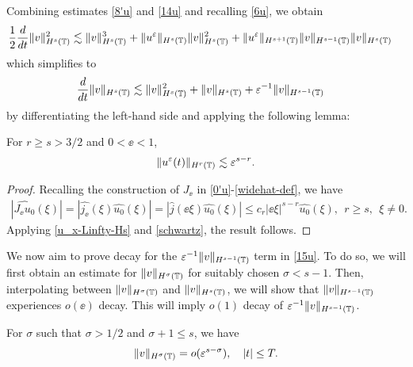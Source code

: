 %
%
Combining estimates \eqref{8'u} and \eqref{14u} and recalling
\eqref{6u}, we obtain
%
%
\begin{equation*}
\begin{split}
\frac{1}{2}\frac{d}{dt}\|v\|_{H^{s}(\mathbb{T})}^2
& \lesssim \|v\|_{H^s(\mathbb{T})}^3 + \|u^\varepsilon\|_{H^s(\mathbb{T})}
\|v\|_{H^s(\mathbb{T})}^2
 + \|u^\varepsilon\|_{H^{s+1}(\mathbb{T})}
\|v\|_{H^{s-1}(\mathbb{T})} \|v\|_{H^s(\mathbb{T})}
\end{split}
\end{equation*}
%
%
which simplifies to 
\begin{equation}
\begin{split}
\frac{d}{dt}\|v\|_{H^{s}(\mathbb{T})}
& \lesssim \|v\|_{H^s(\mathbb{T})}^2 + 
\|v\|_{H^s(\mathbb{T})}
+ \varepsilon^{-1}
\|v\|_{H^{s-1}(\mathbb{T})} 
\label{15u}
\end{split}
\end{equation}
by differentiating the left-hand side and applying the following lemma:
%
%
%
\begin{lemma}
\label{lem5r}
For $r \ge s > 3/2$ and $0 < \ee <1$, 
%
%
\begin{equation}
\begin{split}
\|u^{\varepsilon} (t) \|_{H^r(\mathbb{T})} \lesssim \varepsilon^{s-r}.
\label{700r}
\end{split}
\end{equation}
%
%
\end{lemma}
%
%
\begin{proof} Recalling the construction of $J_\ee$ in 
\eqref{0'u}-\eqref{widehat-def},  we have
%
%
\begin{equation}
\label{schwartz}
\begin{split}
	|\widehat{J_\ee u_0}(\xi)| = |\widehat{j_\ee}(\xi) \widehat{u_0}(\xi)|
	= |\widehat{j }(\ee \xi) \widehat{u_0}(\xi)| \le c_r |\ee \xi 
	|^{s-r} \widehat{u_0}(\xi), \ \ r \ge s, \ \ \xi \neq 0.
\end{split}
\end{equation}
%
%
Applying \eqref{u_x-Linfty-Hs} and \eqref{schwartz}, the result follows.
\end{proof}
%
%
%
We now aim to prove decay for the $\varepsilon^{-1}
\|v\|_{H^{s-1}(\mathbb{T})} $ term in \eqref{15u}. To do so, we 
will first obtain an estimate for
$\|v\|_{H^\sigma(\mathbb{T})}$ for suitably chosen $\sigma < s-1$. Then, 
interpolating between $\|v\|_{H^\sigma(\mathbb{T})}$
and $\|v\|_{H^s(\mathbb{T})}$, we will show that 
$\|v\|_{H^{s-1}(\mathbb{T})}$ experiences $o(\ee)$ decay. This will imply
$o(1)$ decay of $\varepsilon^{-1}
\|v\|_{H^{s-1}(\mathbb{T})} $.
%
%
\begin{proposition} \label{prop:6r}
For $\sigma$ such that $\sigma > 1/2$ and $\sigma + 1 \le s$, we have
%
%
\begin{equation}
\begin{split}
\|v\|_{H^{\sigma}(\mathbb{T})} = o(\varepsilon^{s- \sigma }), \quad |t| \le T.
\end{split}
\end{equation}
%
%
\end{proposition}
